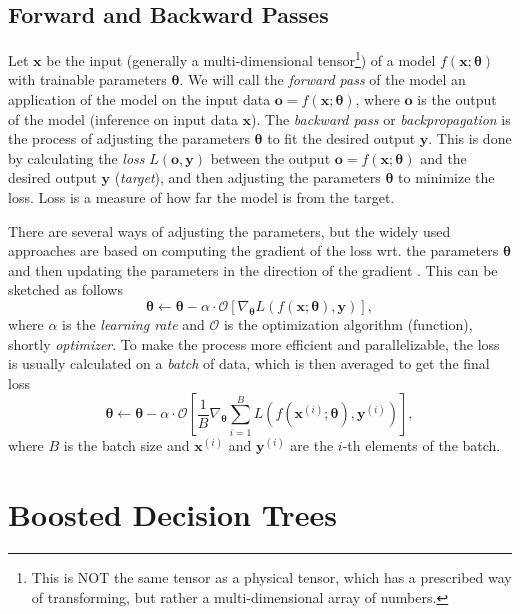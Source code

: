 \subsection{Forward and Backward Passes}
\label{sec:forward_backward}
Let $\pmb{x}$ be the input (generally a multi-dimensional tensor\footnote{This is NOT the same tensor as a physical tensor, which has a prescribed way of transforming, but rather a multi-dimensional array of numbers.}) of a model  $f(\pmb{x};\pmb{\theta})$ with trainable parameters $\pmb{\theta}$.
We will call the \emph{forward pass} of the model an application of the model on the input data $\pmb{o} = f(\pmb{x};\pmb{\theta})$, where $\pmb{o}$ is the output of the model (inference on input data $\pmb{x}$).
The \emph{backward pass} or \emph{backpropagation} is the process of adjusting the parameters $\pmb{\theta}$ to fit the desired output $\pmb{y}$.
This is done by calculating the \emph{loss} $L(\pmb{o},\pmb{y})$ between the output $\pmb{o} = f(\pmb{x};\pmb{\theta})$ and the desired output $\pmb{y}$ (\emph{target}), and then adjusting the parameters $\pmb{\theta}$ to minimize the loss.
Loss is a measure of how far the model is from the target.

There are several ways of adjusting the parameters, but the widely used approaches are based on computing the gradient of the loss wrt. the parameters $\pmb{\theta}$ and then updating the parameters in the direction of the gradient \cite{deeplearningbook}. 
This can be sketched as follows
\begin{equation}
    \pmb{\theta} \leftarrow \pmb{\theta} - \alpha \cdot \mathcal{O}\left[\nabla_{\pmb{\theta}} L(f(\pmb{x};\pmb{\theta}),\pmb{y})\right],
\end{equation}
where $\alpha$ is the \emph{learning rate} and $\mathcal{O}$ is the optimization algorithm (function), shortly \emph{optimizer}.
To make the process more efficient and parallelizable, the loss is usually calculated on a \emph{batch} of data, which is then averaged to get the final loss
\begin{equation}
    \pmb{\theta} \leftarrow \pmb{\theta} - \alpha \cdot \mathcal{O}\left[\frac1B \nabla_{\pmb{\theta}} \sum_{i=1}^B L(f(\pmb{x}^{(i)};\pmb{\theta}),\pmb{y}^{(i)})\right],
\end{equation}
where $B$ is the batch size and $\pmb{x}^{(i)}$ and $\pmb{y}^{(i)}$ are the $i$-th elements of the batch.

\section{Boosted Decision Trees}
\label{sec:bdt}

